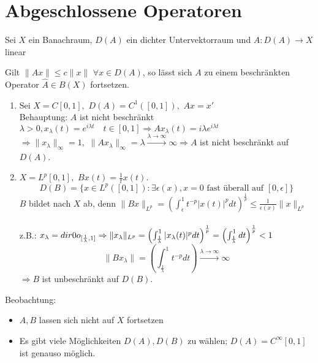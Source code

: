 
\section{Abgeschlossene Operatoren}



Sei $X$ ein Banachraum, $D(A)$ ein dichter Untervektorraum und 
$A: D(A) \rightarrow X$ linear


\begin{erinnerung}
	Gilt $\| A x \| \leq c \| x \|$ $\forall x \in D(A)$, so lässt sich $A$ zu einem beschränkten Operator $\hat A \in B(X)$ fortsetzen.
\end{erinnerung}


\begin{beispiel}
	\begin{enumerate}[label=\alph*\upshape)]
		\item Sei $X = C[0, 1],$ $D(A) = C^{1}([0, 1]),$ $Ax = x'$ \\
			Behauptung: $A$ ist nicht beschränkt \\
			$\lambda > 0, x_{\lambda}(t) = e	^{i \lambda t} \quad t \in [0, 1] \Rightarrow A x_{\lambda}(t) = i \lambda e^{i \lambda t}$ \\
			$\Rightarrow \| x_{\lambda} \|_{\infty} = 1,$ $\| A x_{\lambda} \|_{\infty} = \lambda \xrightarrow[]{\lambda \rightarrow \infty} \infty \Rightarrow A$ ist nicht beschränkt auf $D(A)$.
		\item $X = L	^{p}[0, 1],$ $B x(t) = \frac{1}{t} x(t)$.
			\[ D(B) = \{ x \in L^{p}([0, 1]): \exists \epsilon(x), x = 0 \text{ fast überall auf } [0, \epsilon] \}\]
			$B$ bildet nach $X$ ab, denn $\| B x \|_{L^{p}} = \left( \int_{\epsilon}^{1} t^{-p} |x(t)|^{p} dt \right)^{\frac{1}{p}} \leq \frac{1}{\epsilon(x)} \| x \|_{L^{p}}$ \\ \\
			z.B.: $x_{\lambda} = \1_{[\frac{1}{\lambda}, 1]} \Rightarrow \| x_{\lambda}\|_{L^{p}} = \left( \int_{\frac{1}{\lambda}}^{1} |x_{\lambda}(t)|^{p} dt \right)^{\frac{1}{p}} = \left( \int_{\frac{1}{\lambda}}^{1} dt \right)^{\frac{1}{p}} < 1$
			\[ \| B x_{\lambda} \| = \left( \int_{\frac{1}{\lambda}}^{1} t^{-p} dt \right) \xrightarrow[]{\lambda \rightarrow \infty} \infty \]
			$\Rightarrow B$ ist unbeschränkt auf $D(B)$.
	\end{enumerate}
\end{beispiel}


Beobachtung:
\begin{itemize}
	\item $A, B$ lassen sich nicht auf $X$ fortsetzen
	\item Es gibt viele Möglichkeiten $D(A), D(B)$ zu wählen; $D(A) = C^{\infty}[0, 1]$ ist genauso möglich.
\end{itemize}


